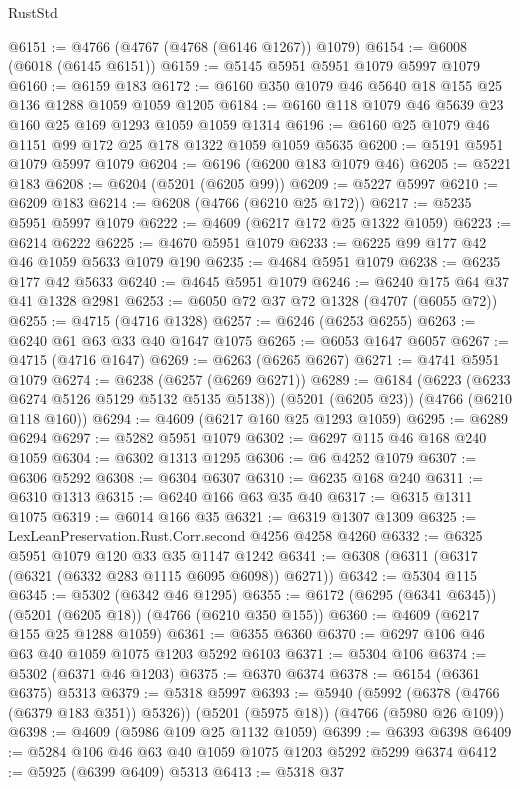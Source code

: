 \begin{lexlean}{RustStd}
\begin{coremodule}
@6151 := @4766 (@4767 (@4768 (@6146 @1267)) @1079)
@6154 := @6008 (@6018 (@6145 @6151))
@6159 := @5145 @5951 @5951 @1079 @5997 @1079
@6160 := @6159 @183
@6172 := @6160 @350 @1079 @46 @5640 @18 @155 @25 @136 @1288 @1059 @1059 @1205
@6184 := @6160 @118 @1079 @46 @5639 @23 @160 @25 @169 @1293 @1059 @1059 @1314
@6196 := @6160 @25 @1079 @46 @1151 @99 @172 @25 @178 @1322 @1059 @1059 @5635
@6200 := @5191 @5951 @1079 @5997 @1079
@6204 := @6196 (@6200 @183 @1079 @46)
@6205 := @5221 @183
@6208 := @6204 (@5201 (@6205 @99))
@6209 := @5227 @5997
@6210 := @6209 @183
@6214 := @6208 (@4766 (@6210 @25 @172))
@6217 := @5235 @5951 @5997 @1079
@6222 := @4609 (@6217 @172 @25 @1322 @1059)
@6223 := @6214 @6222
@6225 := @4670 @5951 @1079
@6233 := @6225 @99 @177 @42 @46 @1059 @5633 @1079 @190
@6235 := @4684 @5951 @1079
@6238 := @6235 @177 @42 @5633
@6240 := @4645 @5951 @1079
@6246 := @6240 @175 @64 @37 @41 @1328 @2981
@6253 := @6050 @72 @37 @72 @1328 (@4707 (@6055 @72))
@6255 := @4715 (@4716 @1328)
@6257 := @6246 (@6253 @6255)
@6263 := @6240 @61 @63 @33 @40 @1647 @1075
@6265 := @6053 @1647 @6057
@6267 := @4715 (@4716 @1647)
@6269 := @6263 (@6265 @6267)
@6271 := @4741 @5951 @1079
@6274 := @6238 (@6257 (@6269 @6271))
@6289 := @6184
    (@6223 (@6233 @6274 @5126 @5129 @5132 @5135 @5138))
    (@5201 (@6205 @23))
    (@4766 (@6210 @118 @160))
@6294 := @4609 (@6217 @160 @25 @1293 @1059)
@6295 := @6289 @6294
@6297 := @5282 @5951 @1079
@6302 := @6297 @115 @46 @168 @240 @1059
@6304 := @6302 @1313 @1295
@6306 := @6 @4252 @1079
@6307 := @6306 @5292
@6308 := @6304 @6307
@6310 := @6235 @168 @240
@6311 := @6310 @1313
@6315 := @6240 @166 @63 @35 @40
@6317 := @6315 @1311 @1075
@6319 := @6014 @166 @35
@6321 := @6319 @1307 @1309
@6325 := LexLeanPreservation.Rust.Corr.second @4256 @4258 @4260
@6332 := @6325 @5951 @1079 @120 @33 @35 @1147 @1242
@6341 := @6308 (@6311 (@6317 (@6321 (@6332 @283 @1115 @6095 @6098)) @6271))
@6342 := @5304 @115
@6345 := @5302 (@6342 @46 @1295)
@6355 := @6172 (@6295 (@6341 @6345)) (@5201 (@6205 @18)) (@4766 (@6210 @350 @155))
@6360 := @4609 (@6217 @155 @25 @1288 @1059)
@6361 := @6355 @6360
@6370 := @6297 @106 @46 @63 @40 @1059 @1075 @1203 @5292 @6103
@6371 := @5304 @106
@6374 := @5302 (@6371 @46 @1203)
@6375 := @6370 @6374
@6378 := @6154 (@6361 @6375) @5313
@6379 := @5318 @5997
@6393 := @5940
    (@5992 (@6378 (@4766 (@6379 @183 @351)) @5326))
    (@5201 (@5975 @18))
    (@4766 (@5980 @26 @109))
@6398 := @4609 (@5986 @109 @25 @1132 @1059)
@6399 := @6393 @6398
@6409 := @5284 @106 @46 @63 @40 @1059 @1075 @1203 @5292 @5299 @6374
@6412 := @5925 (@6399 @6409) @5313
@6413 := @5318 @37

\end{coremodule}
\end{lexlean}
